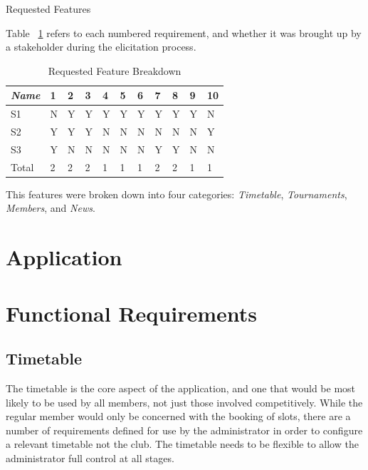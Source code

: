 \begin{table}[H]
\label{fig:requirementsFeatures}
\caption{Requested Features}
\end{table}
Table ~\ref{fig:reqbreakdown} refers to each numbered requirement, and whether it was brought up by a stakeholder during the elicitation process.
\begin{table}[H]
\caption{Requested Feature Breakdown}
\begin{center}
    \begin{tabular}{ | l | l | l | l| l| l| l| l| l|l| p{.22cm} |}
    \hline
     \textit{Name}& 1& 2 & 3 & 4 & 5 & 6 & 7 & 8 & 9 & 10\\ \hline
	 S1 & N & Y & Y & Y & Y & Y & Y & Y & Y & N\\ \hline
	 S2 & Y & Y & Y & N & N & N & N & N & N & Y\\ \hline
	 S3 & Y & N & N & N & N & N & Y & Y & N & N\\ \hline
  Total & 2 & 2 & 2 & 1 & 1 & 1 & 2 & 2 & 1 & 1\\ \hline
    \end{tabular}
\end{center}
\label{fig:reqbreakdown}
\end{table}

This features were broken down into four categories: \textit{Timetable}, \textit{Tournaments}, \textit{Members}, and \textit{News}.

\section{Application}

\section{Functional Requirements}

\subsection{Timetable} 

The timetable is the core aspect of the application, and one that would be most likely to be used by all members, not just those involved competitively. While the regular member would only be concerned with the booking of slots, there are a number of requirements defined for use by the administrator in order to configure a relevant timetable not the club. The timetable needs to be flexible to allow the administrator full control at all stages.

